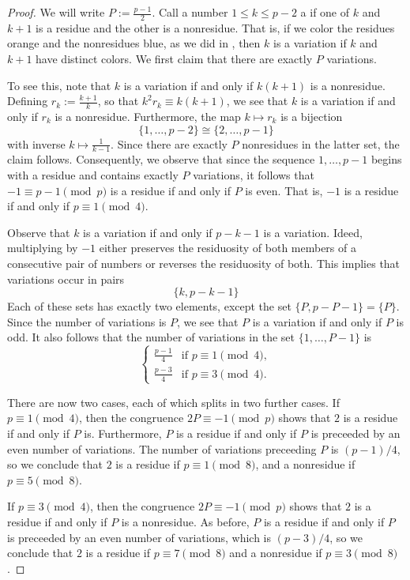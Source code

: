 \begin{proof}
  We will write $P:=\frac{p-1}{2}$. Call a number $1\leq k\leq p-2$ a  if one of $k$ and $k+1$ is a residue and the other is a nonresidue. That is, if we color the residues orange and the nonresidues blue, as we did in , then $k$ is a variation if $k$ and $k+1$ have distinct colors. We first claim that there are exactly $P$ variations.

  To see this, note that $k$ is a variation if and only if $k(k+1)$ is a nonresidue. Defining $r_k:=\frac{k+1}{k}$, so that $k^2r_k\equiv k(k+1)$, we see that $k$ is a variation if and only if $r_k$ is a nonresidue. Furthermore, the map $k\mapsto r_k$ is a bijection
  \begin{equation*}
    \{1,\ldots,p-2\}\cong\{2,\ldots,p-1\}
  \end{equation*}
  with inverse $k\mapsto \frac{1}{k-1}$. Since there are exactly $P$ nonresidues in the latter set, the claim follows. Consequently, we observe that since the sequence $1,\ldots,p-1$ begins with a residue and contains exactly $P$ variations, it follows that $-1\equiv p-1\pmod{p}$ is a residue if and only if $P$ is even. That is, $-1$ is a residue if and only if $p\equiv 1\pmod{4}$.

  Observe that $k$ is a variation if and only if $p-k-1$ is a variation. Ideed, multiplying by $-1$ either preserves the residuosity of both members of a consecutive pair of numbers or reverses the residuosity of both. This implies that variations occur in pairs
  \begin{equation*}
    \{k,p-k-1\}
  \end{equation*}
  Each of these sets has exactly two elements, except the set $\{P,p-P-1\}=\{P\}$. Since the number of variations is $P$, we see that $P$ is a variation if and only if $P$ is odd. It also follows that the number of variations in the set $\{1,\ldots,P-1\}$ is
  \begin{equation*}
    \begin{cases}
      \frac{p-1}{4} & \text{if }p\equiv 1\pmod{4}, \\[4pt]
      \frac{p-3}{4} & \text{if }p\equiv 3\pmod{4}.
    \end{cases}
  \end{equation*}

  There are now two cases, each of which splits in two further cases. If $p\equiv 1\pmod{4}$, then the congruence $2P\equiv -1\pmod{p}$ shows that $2$ is a residue if and only if $P$ is. Furthermore, $P$ is a residue if and only if $P$ is preceeded by an even number of variations. The number of variations preceeding $P$ is $(p-1)/4$, so we conclude that $2$ is a residue if $p\equiv 1\pmod{8}$, and a nonresidue if $p\equiv 5\pmod{8}$.

  If $p\equiv 3\pmod{4}$, then the congruence $2P\equiv -1\pmod{p}$ shows that $2$ is a residue if and only if $P$ is a nonresidue. As before, $P$ is a residue if and only if $P$ is preceeded by an even number of variations, which is $(p-3)/4$, so we conclude that $2$ is a residue if $p\equiv 7\pmod{8}$ and a nonresidue if $p\equiv 3\pmod{8}$.
\end{proof}

